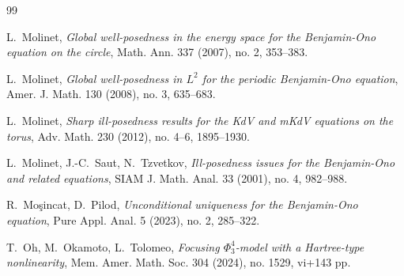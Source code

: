 \documentclass[letterpaper, 11pt,  reqno]{amsart}
\newcommand{\1}{\hspace{0.5mm}\text{I}\hspace{0.5mm}}
\numberwithin{equation}{section}
\numberwithin{theorem}{section}
\begin{document}
\begin{thebibliography}{99}
%
%
%


%
%
%
%



%
%



L.~Molinet, 
{\it Global well-posedness in the energy space for the Benjamin-Ono equation on the circle},
Math. Ann. 337 (2007), no. 2, 353--383. 


L.~Molinet, 
{\it Global well-posedness in $L^2$ for the periodic Benjamin-Ono equation}, 
Amer. J. Math. 130 (2008), no. 3, 635--683. 








L.~Molinet,
{\it Sharp ill-posedness results for the KdV and mKdV equations on the torus},
Adv. Math. 230 (2012), no. 4--6, 1895--1930.







L.~Molinet, J.-C.~Saut, N.~Tzvetkov, 
{\it Ill-posedness issues for the Benjamin-Ono and related equations},
SIAM J. Math. Anal. 33 (2001), no. 4, 982--988. 


R.~Mo\c{s}incat, D.~Pilod, 
{\it  Unconditional uniqueness for the Benjamin-Ono equation}, Pure Appl. Anal. 5 (2023), no. 2, 285--322. 



%
 

T.~Oh, M.~Okamoto, L.~Tolomeo,
{\it Focusing $\Phi^4_3$-model with a Hartree-type nonlinearity}, 
Mem. Amer. Math. Soc. 304 (2024), no. 1529, vi+143 pp. 




\end{thebibliography}
\end{document}
